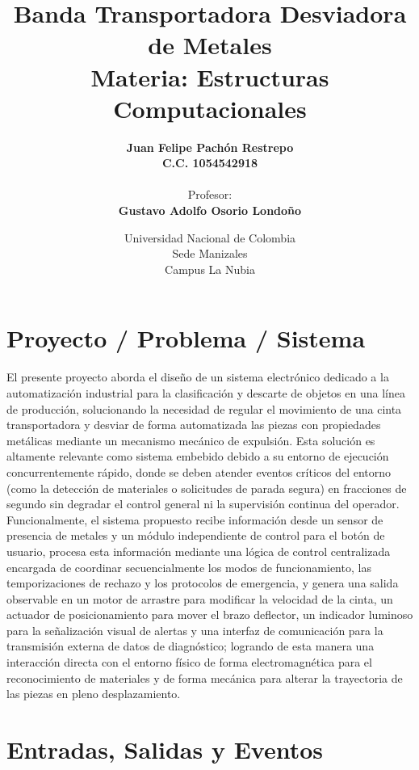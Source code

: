 \documentclass[12pt, letterpaper]{article}
\title{
    \vspace{2cm}
    \Huge \textsf{\textbf{Banda Transportadora Desviadora de Metales}} \\
    \vspace{1cm}
    \large Materia: Estructuras Computacionales \\
    \vspace{2cm}
}
\author{
    \textbf{Juan Felipe Pachón Restrepo} \\
    \textbf{C.C. 1054542918} \\
    \vspace{1.5cm} \\
    Profesor: \\
    \textbf{Gustavo Adolfo Osorio Londoño}
}
\date{
    \vfill
    Universidad Nacional de Colombia \\
    Sede Manizales \\
    Campus La Nubia
}
\begin{document}
\maketitle
\thispagestyle{empty} %
\clearpage

\tableofcontents
\clearpage

\section{Proyecto / Problema / Sistema}
\label{sec:proyecto_problema_sistema}

El presente proyecto aborda el diseño de un sistema electrónico dedicado a la automatización industrial para la clasificación y descarte de objetos en una línea de producción, solucionando la necesidad de regular el movimiento de una cinta transportadora y desviar de forma automatizada las piezas con propiedades metálicas mediante un mecanismo mecánico de expulsión. Esta solución es altamente relevante como sistema embebido debido a su entorno de ejecución concurrentemente rápido, donde se deben atender eventos críticos del entorno (como la detección de materiales o solicitudes de parada segura) en fracciones de segundo sin degradar el control general ni la supervisión continua del operador. Funcionalmente, el sistema propuesto recibe información desde un sensor de presencia de metales y un módulo independiente de control para el botón de usuario, procesa esta información mediante una lógica de control centralizada encargada de coordinar secuencialmente los modos de funcionamiento, las temporizaciones de rechazo y los protocolos de emergencia, y genera una salida observable en un motor de arrastre para modificar la velocidad de la cinta, un actuador de posicionamiento para mover el brazo deflector, un indicador luminoso para la señalización visual de alertas y una interfaz de comunicación para la transmisión externa de datos de diagnóstico; logrando de esta manera una interacción directa con el entorno físico de forma electromagnética para el reconocimiento de materiales y de forma mecánica para alterar la trayectoria de las piezas en pleno desplazamiento.

\clearpage

\section{Entradas, Salidas y Eventos}
\label{sec:entradas_salidas_eventos}
\end{document}

